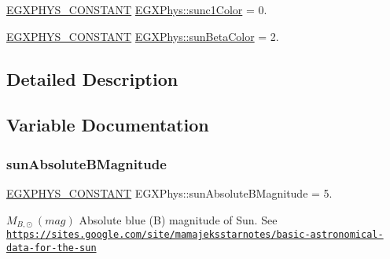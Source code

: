 \begin{DoxyCompactItemize}
\item 
\mbox{\hyperlink{group___e_g_x_phys-_constants-_macros_ga76980d288494ce1714c9ac68a95ba702}{E\+G\+X\+P\+H\+Y\+S\+\_\+\+C\+O\+N\+S\+T\+A\+NT}} \mbox{\hyperlink{group___e_g_x_phys-_constants-_astrophysics-_solar_system-_sun-_magnitude_ga3783eaaa554c73254c8c8c85817432c5}{E\+G\+X\+Phys\+::sunc1\+Color}} = 0.
\item 
\mbox{\hyperlink{group___e_g_x_phys-_constants-_macros_ga76980d288494ce1714c9ac68a95ba702}{E\+G\+X\+P\+H\+Y\+S\+\_\+\+C\+O\+N\+S\+T\+A\+NT}} \mbox{\hyperlink{group___e_g_x_phys-_constants-_astrophysics-_solar_system-_sun-_magnitude_ga984a3f3b2fecd776489d45d2f8dbdd54}{E\+G\+X\+Phys\+::sun\+Beta\+Color}} = 2.
\end{DoxyCompactItemize}


\subsection{Detailed Description}


\subsection{Variable Documentation}
\mbox{\label{group___e_g_x_phys-_constants-_astrophysics-_solar_system-_sun-_magnitude_gaf502455ab636f55477650dfef5ce6d75}} 
\subsubsection{\texorpdfstring{sun\+Absolute\+B\+Magnitude}{sunAbsoluteBMagnitude}}
{\footnotesize\ttfamily \mbox{\hyperlink{group___e_g_x_phys-_constants-_macros_ga76980d288494ce1714c9ac68a95ba702}{E\+G\+X\+P\+H\+Y\+S\+\_\+\+C\+O\+N\+S\+T\+A\+NT}} E\+G\+X\+Phys\+::sun\+Absolute\+B\+Magnitude = 5.}

$ M_{B,\odot} \ (mag)$ Absolute blue (B) magnitude of Sun. See \href{https://sites.google.com/site/mamajeksstarnotes/basic-astronomical-data-for-the-sun}{\tt https\+://sites.\+google.\+com/site/mamajeksstarnotes/basic-\/astronomical-\/data-\/for-\/the-\/sun} \mbox{\label{group___e_g_x_phys-_constants-_astrophysics-_solar_system-_sun-_magnitude_ga57682e24f2eef1776c7c3c76f938d44e}} 
